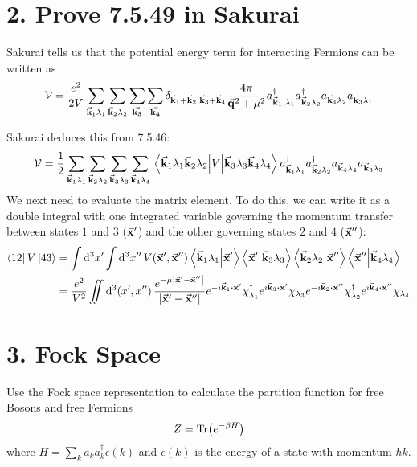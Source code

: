 \documentclass[a4paper,twoside]{article}
\begin{document}
\section*{2. Prove 7.5.49 in Sakurai}
Sakurai tells us that the potential energy term for interacting Fermions can be written as
\begin{equation}
    \mathcal{V} = \frac{e^2}{2V} \sum_{\va{k}_1 \lambda_1} \sum_{\va{k}_2 \lambda_2} \sum_{\va{k_3}} \sum_{\va{k_4}} \delta_{\va{k}_1 + \va{k}_2, \va{k}_3 + \va{k}_4} \frac{4 \pi}{\va{q}^2 + \mu^2} a^\dagger_{\va{k}_1, \lambda_1} a^\dagger_{\va{k}_2 \lambda_2} a_{\va{k}_4 \lambda_2} a_{\va{k}_3 \lambda_1}
\end{equation}
\begin{problem}
    Sakurai deduces this from 7.5.46:
    \begin{equation}
        \mathcal{V} = \frac{1}{2} \sum_{\va{k}_1 \lambda_1} \sum_{\va{k}_2 \lambda_2} \sum_{\va{k}_3 \lambda_3} \sum_{\va{k}_4 \lambda_4} \mel{\va{k}_1 \lambda_1 \va{k}_2 \lambda_2}{V}{\va{k}_3 \lambda_3 \va{k}_4 \lambda_4} a^\dagger_{\va{k}_1 \lambda_1} a^\dagger_{\va{k}_2 \lambda_2} a_{\va{k}_4 \lambda_4} a_{\va{k}_3 \lambda_3} 
    \end{equation}
    We next need to evaluate the matrix element. To do this, we can write it as a double integral with one integrated variable governing the momentum transfer between states $ 1 $ and $ 3 $ ($ \va{x}' $) and the other governing states $ 2 $ and $ 4 $ ($ \va{x}'' $):
    \begin{align}
        \bra{12} V\ket{43} &= \int \dd[3]{x'} \int \dd[3]{x''} V(\va{x}', \va{x}'')\bra{\va{k}_1 \lambda_1}\ket{\va{x}'}\bra{\va{x}'}\ket{\va{k}_3 \lambda_3}\bra{\va{k}_2 \lambda_2}\ket{\va{x}''}\bra{\va{x}''}\ket{\va{k}_4 \lambda_4} \\
        &= \frac{e^2}{V^2} \iint \dd[3]{(x',x'')} \frac{e^{- \mu \abs{\va{x}' - \va{x}''}}}{\abs{\va{x}' - \va{x}''}} e^{- \imath \va{k}_1 \vdot \va{x}'} \chi^\dagger_{\lambda_1} e^{\imath \va{k}_3 \vdot \va{x}'} \chi_{\lambda_3} e^{- \imath \va{k}_2 \vdot \va{x}''} \chi^\dagger_{\lambda_2} e^{\imath \va{k}_4 \vdot \va{x}''} \chi_{\lambda_4}
    \end{align}
\end{problem}
\section*{3. Fock Space}
Use the Fock space representation to calculate the partition function for free Bosons and free Fermions
\begin{equation}
    Z = \Tr(e^{- \beta H})
\end{equation}
where $ H = \sum_k a_k a^\dagger_k \epsilon(k) $ and $ \epsilon(k) $ is the energy of a state with momentum $ \hbar k $.
\end{document}
